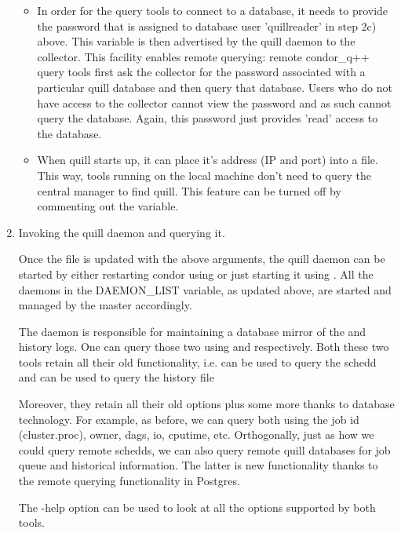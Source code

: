 \begin{enumerate}
\begin{itemize}
\item {}
In order for the query tools to connect to a database, it needs to
provide the password that is assigned to database user 'quillreader' in
step 2c) above. This variable is then advertised by the quill daemon to
the collector.  This facility enables remote querying: remote condor\_q++
query tools first ask the collector for the password associated with a
particular quill database and then query that database.  Users who do
not have access to the collector cannot view the password and as such
cannot query the database.  Again, this password just provides 'read'
access to the database.

\item {}
When quill starts up, it can place it's address (IP and port)
into a file.  This way, tools running on the local machine don't
need to query the central manager to find quill.  This 
feature can be turned off by commenting out the variable.

\end{itemize}

\item Invoking the quill daemon and querying it.

Once the  file is updated with the above arguments,
the quill daemon can be started by either restarting condor using
 or just starting it using .  All the daemons
in the DAEMON\_LIST variable, as updated above, are started and managed
by the master accordingly.

The  daemon is responsible for maintaining a database
mirror of the  and history logs.  One can query those two
using  and  respectively.  Both these two
tools retain all their old functionality, i.e.  can be used
to query the schedd and  can be used to query the
history file

Moreover, they retain all their old options plus some more thanks to
database technology.  For example, as before, we can query both using
the job id (cluster.proc), owner, dags, io, cputime, etc.  Orthogonally,
just as how we could query remote schedds, we can also query remote quill
databases for job queue and historical information.  The latter is new
functionality thanks to the remote querying functionality in Postgres.

The -help option can be used to look at all the options supported by
both tools.
\end{enumerate}


